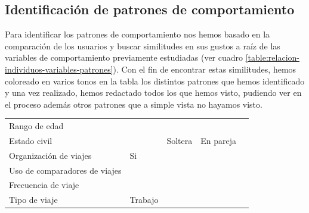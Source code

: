 \subsection{Identificación de patrones de comportamiento}
Para identificar los patrones de comportamiento nos hemos basado en la comparación de los usuarios y buscar similitudes en sus gustos a raíz de las variables 
de comportamiento previamente estudiadas (ver cuadro \ref{table:relacion-individuos-variables-patrones}). Con el fin de encontrar estas similitudes, hemos coloreado
en varios tonos en la tabla los distintos patrones que hemos identificado y una vez realizado, hemos redactado todos los que hemos visto, pudiendo ver en el proceso
además otros patrones que a simple vista no hayamos visto.
\begin{table}[H]
    \centering
    \begin{tabular}{|p{10em}|p{7em}|p{7em}|p{7em}|p{8em}|}
        \cellcolor{black}                 & \cellcolor{black}{\textcolor{white}{Madi}}  & \cellcolor{black}{\textcolor{white}{Sofía}}   & \cellcolor{black}{\textcolor{white}{Beatriz}}     \\ \hline
        Rango de edad                     &                                             & \cellcolor{green}{18 - 25}                    & \cellcolor{green}{18 - 25}                        \\ \hline
        Estado civil                      &                                             & Soltera                                       & En pareja                                         \\ \hline
        Organización de viajes            & Si                                          & \cellcolor{green}{Si}                         & \cellcolor{green}{Si}                             \\ \hline
        Uso de comparadores de viajes     & \cellcolor{yellow}{No}                      & \cellcolor{purple}{Kayak, Skyscanner, Trivago}& \cellcolor{purple}{eDreams, comparador de Google} \\ \hline
        Frecuencia de viaje               & \cellcolor{yellow}{Alta}                    & \cellcolor{purple}{Media}                     & \cellcolor{purple}{Baja}                          \\ \hline
        Tipo de viaje                     & Trabajo                                     & \cellcolor{green}{Ocio}                       & \cellcolor{green}{Ocio}                           \\ \hline

\end{tabular}
\end{table}
